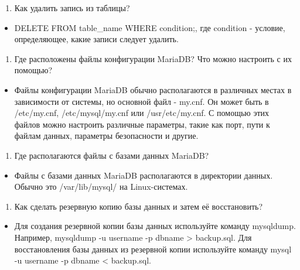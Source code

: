 \documentclass[
  12pt,
  a4paper,
  DIV=11,
  numbers=noendperiod]{scrreprt}
\providecommand{\tightlist}{%
  \setlength{\itemsep}{0pt}\setlength{\parskip}{0pt}}\usepackage{longtable,booktabs,array}
\begin{document}
\begin{enumerate}
\def\labelenumi{\arabic{enumi}.}
\setcounter{enumi}{6}
\tightlist
\item
  Как удалить запись из таблицы?
\end{enumerate}

\begin{itemize}
\tightlist
\item
  DELETE FROM table\_name WHERE condition;, где condition - условие,
  определяющее, какие записи следует удалить.
\end{itemize}

\begin{enumerate}
\def\labelenumi{\arabic{enumi}.}
\setcounter{enumi}{7}
\tightlist
\item
  Где расположены файлы конфигурации MariaDB? Что можно настроить с их
  помощью?
\end{enumerate}

\begin{itemize}
\tightlist
\item
  Файлы конфигурации MariaDB обычно располагаются в различных местах в
  зависимости от системы, но основной файл - my.cnf. Он может быть в
  /etc/my.cnf, /etc/mysql/my.cnf или /usr/etc/my.cnf. С помощью этих
  файлов можно настроить различные параметры, такие как порт, пути к
  файлам данных, параметры безопасности и другие.
\end{itemize}

\begin{enumerate}
\def\labelenumi{\arabic{enumi}.}
\setcounter{enumi}{8}
\tightlist
\item
  Где располагаются файлы с базами данных MariaDB?
\end{enumerate}

\begin{itemize}
\tightlist
\item
  Файлы с базами данных MariaDB располагаются в директории данных.
  Обычно это /var/lib/mysql/ на Linux-системах.
\end{itemize}

\begin{enumerate}
\def\labelenumi{\arabic{enumi}.}
\setcounter{enumi}{9}
\tightlist
\item
  Как сделать резервную копию базы данных и затем её восстановить?
\end{enumerate}

\begin{itemize}
\tightlist
\item
  Для создания резервной копии базы данных используйте команду
  mysqldump. Например, mysqldump -u username -p dbname \textgreater{}
  backup.sql. Для восстановления базы данных из резервной копии
  используйте команду mysql -u username -p dbname \textless{}
  backup.sql.
\end{itemize}


\printbibliography
\end{document}
